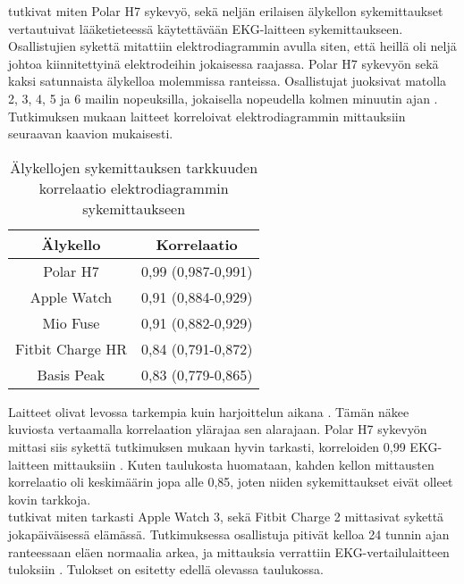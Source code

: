 \documentclass[utf8,bachelor,finnish]{bachelor}
\begin{document}
   \textcite{wang_accuracy_2017} tutkivat miten Polar H7 sykevyö, sekä neljän erilaisen älykellon sykemittaukset vertautuivat lääketieteessä käytettävään
    EKG-laitteen sykemittaukseen. Osallistujien sykettä mitattiin elektrodiagrammin avulla siten,
      että heillä oli neljä johtoa kiinnitettyinä elektrodeihin jokaisessa raajassa. Polar H7 sykevyön sekä kaksi satunnaista älykelloa molemmissa ranteissa.
       Osallistujat juoksivat matolla 2, 3, 4, 5 ja 6 mailin nopeuksilla, jokaisella nopeudella kolmen minuutin ajan \parencite{wang_accuracy_2017}.
        Tutkimuksen mukaan laitteet korreloivat elektrodiagrammin mittauksiin seuraavan kaavion mukaisesti.\\


  \begin{table}[H]
    \begin{center}
      \begin{tabular}{||c c||} 
       \hline
       Älykello & Korrelaatio\\
       \hline\hline
       Polar H7 & 0,99 (0,987-0,991)\\
       \hline
      Apple Watch & 0,91 (0,884-0,929)\\
      \hline
      Mio Fuse & 0,91 (0,882-0,929)\\
      \hline
      Fitbit Charge HR & 0,84 (0,791-0,872)\\
      \hline
      Basis Peak & 0,83 (0,779-0,865)\\[0.5ex]
      \hline
      \end{tabular}
    \caption{Älykellojen sykemittauksen tarkkuuden korrelaatio elektrodiagrammin sykemittaukseen \parencite{wang_accuracy_2017}}
      \end{center}
    \end{table}

  Laitteet olivat levossa tarkempia kuin harjoittelun aikana \parencite{wang_accuracy_2017}. Tämän näkee kuviosta vertaamalla korrelaation ylärajaa sen alarajaan.
   Polar H7 sykevyön mittasi siis sykettä tutkimuksen mukaan hyvin tarkasti, korreloiden 0,99 EKG-laitteen mittauksiin \parencite{wang_accuracy_2017}.
    Kuten taulukosta huomataan, kahden kellon mittausten korrelaatio oli keskimäärin jopa alle 0,85, joten niiden sykemittaukset eivät olleet kovin tarkkoja.\\
  
  \textcite{nelson_accuracy_2019} tutkivat miten tarkasti Apple Watch 3, sekä Fitbit Charge 2 mittasivat sykettä jokapäiväisessä elämässä.
   Tutkimuksessa osallistuja pitivät kelloa 24 tunnin ajan ranteessaan eläen normaalia arkea, ja mittauksia verrattiin
    EKG-vertailulaitteen tuloksiin \parencite{nelson_accuracy_2019}. Tulokset on esitetty edellä olevassa taulukossa.\\
    
\end{document}
